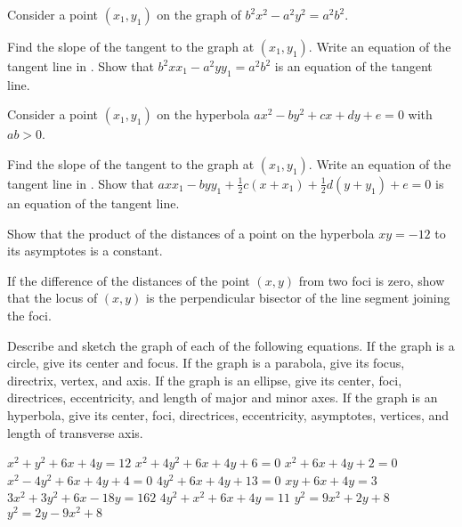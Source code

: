 \begin{exercises}
Consider a point $(x_1,y_1)$ on the graph of
$b^2x^2 - a^2y^2 = a^2b^2$.
\begin{exenum}
\sx
{}
Find the slope of the tangent to the graph at
$(x_1,y_1)$.
\sx
Write an equation of the tangent line in .
\sx
Show that
$b^2xx_1-a^2yy_1=a^2b^2$
is an equation of the tangent line.
\end{exenum}

Consider a point $(x_1,y_1)$ on the hyperbola
$ax^2-by^2+cx+dy+e=0$ with $ab>0$.
\begin{exenum}
\sx
{}
Find the slope of the tangent to the graph at
$(x_1,y_1)$.
\sx
Write an equation of the tangent line in .
\sx
Show that
$axx_1-byy_1+\frac12c(x+x_1)+\frac12d(y+y_1)+e=0$
is an equation of the tangent line.
\end{exenum}

Show that the product of the distances of a point on the
hyperbola $xy = -12$ to its asymptotes is a constant.

If the difference of the distances of the point $(x,y)$
from two foci is zero, show that the locus of $(x,y)$
is the perpendicular bisector of the line segment
joining the foci.

Describe and sketch the graph of each of the following
equations.  If the graph is a circle, give its center and focus.
If the graph is a parabola, give its focus, directrix, vertex,
and axis.  If the graph is an ellipse, give its center, foci,
directrices, eccentricity, and length of major and minor
axes.  If the graph is an hyperbola, give its center, foci,
directrices, eccentricity, asymptotes, vertices, and length
of transverse axis.
\begin{exenum}
\sx
$x^2 + y^2 + 6x + 4y = 12$
\sx
$x^2 + 4y^2 + 6x + 4y + 6 = 0$
\sx
$x^2 + 6x + 4y + 2 = 0$
\sx
$x^2 - 4y^2 + 6x + 4y + 4 = 0$
\sx
$4y^2 + 6x + 4y + 13 = 0$
\sx
$xy + 6x + 4y = 3$
\sx
$3x^2 + 3y^2 + 6x - 18y = 162$
\sx
$4y^2 + x^2 + 6x + 4y = 11$
\sx
$y^2 = 9x^2 + 2y + 8$
\sx
$y^2 = 2y -9x^2 + 8$
\end{exenum}

\end{exercises}
